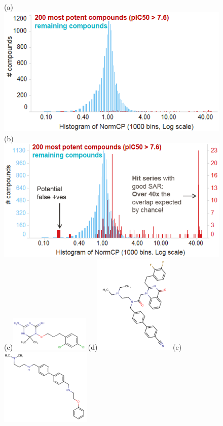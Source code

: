 \documentclass[journal=jacsat,manuscript=article]{achemso}
\begin{document}
\begin{figure}
  (a)\includegraphics[width=4.5in]{fig/NormCP_all.png}\\
  (b)\includegraphics[width=4.5in]{fig/NormCP_top200.png}\\
  (c)\includegraphics[width=1.5in]{fig/NormCP=42_5_pIC50=8_49_CID524739.png}
  (d)\includegraphics[width=1.5in]{fig/NormCP=0_17_pIC50=8_22_CID541941.png}
  (e)\includegraphics[width=1.7in]{fig/NormCP=0_16_pIC50=7_73_CID531249.png}  

\end{figure}
\end{document}
